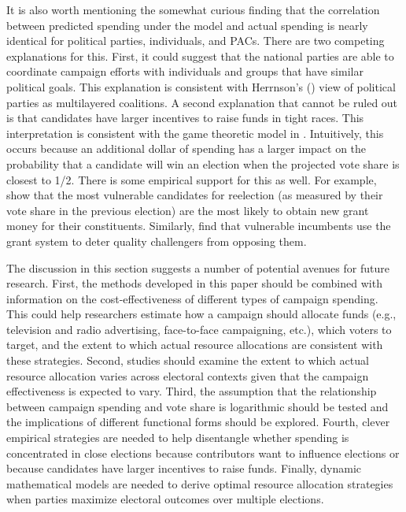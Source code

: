 \documentclass[12pt,final,fleqn]{article}
\theoremstyle{plain}
\begin{document}
It is also worth mentioning the somewhat curious finding that the correlation between predicted spending under the model and actual spending is nearly identical for political parties, individuals, and PACs. There are two competing explanations for this. First, it could suggest that the national parties are able to coordinate campaign efforts with individuals and groups that have similar political goals. This explanation is consistent with Herrnson's (\citeyear{herrnson2009roles}) view of political parties as multilayered coalitions. A second explanation that cannot be ruled out is that candidates have larger incentives to raise funds in tight races. This interpretation is consistent with the game theoretic model in \citet{erikson2000equilibria}. Intuitively, this occurs because an additional dollar of spending has a larger impact on the probability that a candidate will win an election when the projected vote share is closest to 1/2. There is some empirical support for this as well. For example, \citet{stein1994congressional} show that the most vulnerable candidates for reelection (as measured by their vote share in the previous election) are the most likely to obtain new grant money for their constituents. Similarly, \citet{bickers1996electoral} find that vulnerable incumbents use the grant system to deter quality challengers from opposing them.

The discussion in this section suggests a number of potential avenues for future research. First, the methods developed in this paper should be combined with information on the cost-effectiveness of different types of campaign spending. This could help researchers estimate how a campaign should allocate funds (e.g., television and radio advertising, face-to-face campaigning, etc.), which voters to target, and the extent to which actual resource allocations are consistent with these strategies. Second, studies should examine the extent to which actual resource allocation varies across electoral contexts given that the campaign effectiveness is expected to vary. Third, the assumption that the relationship between campaign spending and vote share is logarithmic should be tested and the implications of different functional forms should be explored. Fourth, clever empirical strategies are needed to help disentangle whether spending is concentrated in close elections because contributors want to influence elections or because candidates have larger incentives to raise funds. Finally, dynamic mathematical models are needed to derive optimal resource allocation strategies when parties maximize electoral outcomes over multiple elections.  
\end{document}
